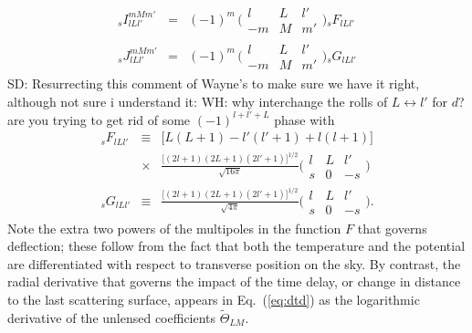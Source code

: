 \documentclass[prl,amsmath,amssymb,floatfix,superscriptaddress,nofootinbib,twocolumn]{revtex4-1}
\def\bea{\begin{eqnarray}}
\def\eea{\end{eqnarray}}
\newcommand{\ec}[1]{Eq.~(\ref{eq:#1})}
\newcommand{\eql}[1]{\label{eq:#1}}
\newcommand{\scott}[1]{{\color{darkgreen} SD: #1}}
\newcommand{\wh}[1]{{\color{red} WH: #1}}
\begin{document}
\bea
{}_{s}I_{lLl'}^{mMm'}  &=& (-1)^m\,
\bigl(\begin{smallmatrix} l & L & l' \\ -m & M & m'  \end{smallmatrix}\bigr) {}_{s}F_{lLl'} \\
{}_{s}J_{lLl'}^{mMm'}  &=& (-1)^m\,
\bigl(\begin{smallmatrix} l & L & l' \\ -m & M & m'  \end{smallmatrix}\bigr) {}_{s}G_{lLl'}
\eea
\scott{Resurrecting this comment of Wayne's to make sure we have it right, although not sure i understand it:} \wh{why interchange the rolls of $L \leftrightarrow l'$ for $d$? are you trying to get rid of some $(-1)^{l+l'+L}$ phase }
%
%
with
\bea
{}_{s}F_{lLl'} &\equiv& \big[L(L+1)-l'(l'+1)+l(l+1)\big]\nonumber  \\& \times& \frac{\big[ (2l+1)(2L+1)(2l'+1)\big]^{1/2} }{\sqrt{16 \pi}} \bigl(\begin{smallmatrix} l & L & l' \\ s & 0 & -s  \end{smallmatrix}\bigr) \\
{}_{s}G_{lLl'} &\equiv& \frac{\big[ (2l+1)(2L+1)(2l'+1)\big]^{1/2} }{\sqrt{4 \pi}} \bigl(\begin{smallmatrix} l & L & l' \\ s & 0 & -s  \end{smallmatrix}\bigr)\eql{fg}
.\eea
Note the extra two powers of the multipoles in the function $F$ that governs deflection; these follow from the fact that both the temperature and the potential are differentiated with respect to transverse position on the sky. By contrast, the radial derivative that governs the impact of the time delay, or change in distance to the last scattering surface, appears in \ec{dtd} as the logarithmic derivative of the unlensed coefficients $\tilde\Theta_{LM}$.
\end{document}
